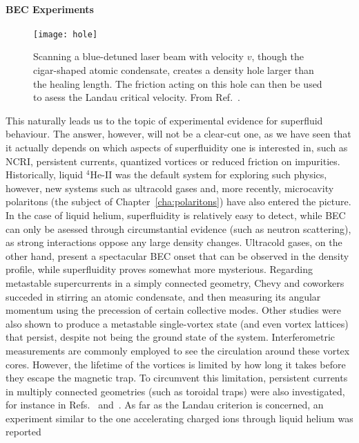 \paragraph{BEC Experiments}
%
\begin{figure}[tb]\centering
  \texttt{[image: hole]}
  \caption{
    Scanning a blue-detuned laser beam with velocity $v$, though the
    cigar-shaped atomic condensate, creates a density hole larger than the
    healing length. The friction acting on this hole can then be used to asess
    the Landau critical velocity. From Ref.~\cite{Raman_1999}.
  }\label{fig:hole}
\end{figure}
% 
This naturally leads us to the topic of experimental evidence for
superfluid behaviour. The answer, however, will not be a clear-cut
one, as we have seen that it actually depends on which aspects of
superfluidity one is interested in, such as NCRI, persistent currents,
quantized vortices or reduced friction on impurities. Historically,
liquid ${}^4$He-II was the default system for exploring such physics,
however, new systems such as ultracold gases and, more recently,
microcavity polaritons (the subject of Chapter~\ref{cha:polaritons})
have also entered the picture. In the case of liquid helium,
superfluidity is relatively easy to detect, while BEC can only be
asessed through circumstantial evidence (such as neutron scattering),
as strong interactions oppose any large density changes. Ultracold
gases, on the other hand, present a spectacular BEC onset that can be
observed in the density profile, while superfluidity proves somewhat
more mysterious.
%
Regarding metastable supercurrents in a simply connected geometry,
Chevy and coworkers~\cite{Chevy2000} succeded in stirring an atomic
condensate, and then measuring its angular momentum using the
precession of certain collective modes.  Other studies were also shown
to produce a metastable single-vortex state (and even vortex lattices)
that persist, despite not being the ground state of the
system. Interferometric measurements are commonly employed to see the
circulation around these vortex cores.  However, the lifetime of the
vortices is limited by how long it takes before they escape the
magnetic trap. To circumvent this limitation, persistent currents in
multiply connected geometries (such as toroidal traps) were also
investigated, for instance in Refs.~\cite{Ryu2007}
and~\cite{Ramanathan2011}.
% 
As far as the Landau criterion is concerned, an experiment similar to
the one accelerating charged ions through liquid helium was reported
